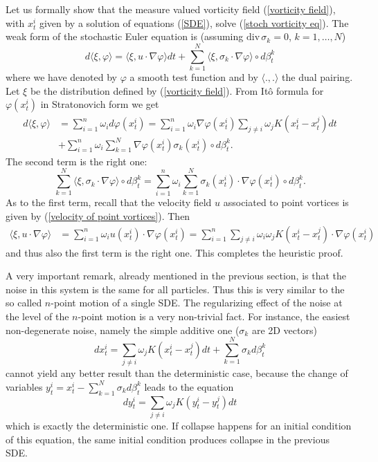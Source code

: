 \documentclass[11pt,a4paper]{article}%
\begin{document}
Let us formally show that the measure valued vorticity field
(\ref{vorticity field}), with $x_{t}^{i}$ given by a solution of equations
(\ref{SDE}), solve (\ref{stoch vorticity eq}). The weak form of the stochastic
Euler equation is (assuming $\mathrm{div}\,\sigma_{k}=0$, $k =1, \ldots, N$)
\[
d\langle\xi,\varphi\rangle=\langle\xi,u\cdot\nabla\varphi\rangle dt+\sum
_{k=1}^{N}\langle\xi,\sigma_{k}\cdot\nabla\varphi\rangle\circ d\beta_{t}^{k}%
\]
where we have denoted by $\varphi$ a smooth test function and by
$\langle.,.\rangle$ the dual pairing. Let $\xi$ be the distribution defined by
(\ref{vorticity field}). From It\^{o} formula for $\varphi( x_{t}^{i}) $ in
Stratonovich form we get
\begin{align*}
d\langle\xi,\varphi\rangle &  =\sum_{i=1}^{n}\omega_{i}d\varphi( x_{t}^{i})
=\sum_{i=1}^{n}\omega_{i}\nabla\varphi( x_{t}^{i}) \sum_{j\neq i}\omega_{j}K(
x_{t}^{i}-x_{t}^{j}) dt\\
&  +\sum_{i=1}^{n}\omega_{i}\sum_{k=1}^{N}\nabla\varphi( x_{t}^{i}) \sigma
_{k}( x_{t}^{i}) \circ d\beta_{t}^{k}.
\end{align*}
The second term is the right one:
\[
\sum_{k=1}^{N}\langle\xi,\sigma_{k}\cdot\nabla\varphi\rangle\circ d\beta
_{t}^{k}=\sum_{i=1}^{n}\omega_{i}\sum_{k=1}^{N}\sigma_{k}( x_{t}^{i})
\cdot\nabla\varphi( x_{t}^{i}) \circ d\beta_{t}^{k}.
\]
As to the first term, recall that the velocity field $u$ associated to point
vortices is given by (\ref{velocity of point vortices}). Then
\begin{align*}
\langle\xi,u\cdot\nabla\varphi\rangle &  =\sum_{i=1}^{n}\omega_{i}u( x_{t}%
^{i}) \cdot\nabla\varphi( x_{t}^{i})
 =\sum_{i=1}^{n}\sum_{j\neq i}\omega_{i}\omega_{j}K( x_{t}^{i}-x_{t}^{j})
\cdot\nabla\varphi( x_{t}^{i})
\end{align*}
and thus also the first term is the right one. This completes the heuristic proof.

A very important remark,  already mentioned in the previous section,  is that
the noise in this system is the same for all particles. Thus this is very
similar to the so called $n$-point motion of a single SDE. The regularizing
effect of the noise at the level of the $n$-point motion is a very non-trivial
fact. For instance, the easiest non-degenerate noise, namely the simple
additive one ($\sigma_{k}$ are 2D vectors)
\[
dx_{t}^{i}=\sum_{j\neq i}\omega_{j}K( x_{t}^{i}-x_{t}^{j}) dt+\sum_{k=1}%
^{N}\sigma_{k}d\beta_{t}^{k}%
\]
cannot yield any better result than the deterministic case, because the change
of variables  $y_{t}^{i}=x_{t}^{i}-\sum_{k=1}^{N}\sigma_{k}d\beta_{t}^{k}$
leads to the equation
\[
dy_{t}^{i}=\sum_{j\neq i}\omega_{j}K( y_{t}^{i}-y_{t}^{j}) dt
\]
which is exactly the deterministic one. If collapse happens for an initial
condition of this equation, the same initial condition produces collapse in
the previous SDE.
\end{document}
